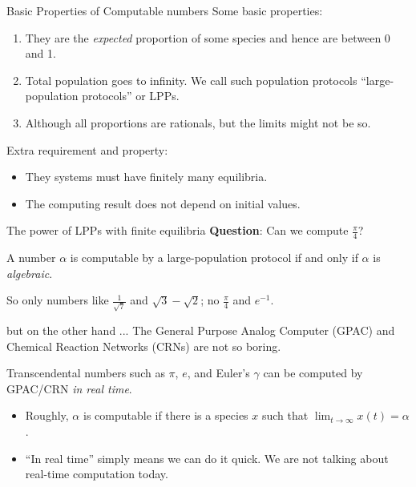 \documentclass[aspectratio=169]{beamer}
\begin{document}
\begin{frame}{Basic Properties of Computable numbers}
Some basic properties:
\begin{enumerate}
    \item They are the \emph{expected} proportion of some species and hence are between 0 and 1.
    \item Total population goes to infinity. We call such population protocols ``large-population protocols'' or LPPs.
    \item Although all proportions are rationals, but the limits might not be so.
\end{enumerate} \pause
Extra requirement and property:
\begin{itemize}
    \item They systems must have finitely many equilibria.
    \item The computing result does not depend on initial values.
\end{itemize}

\end{frame}

\begin{frame}[Clean]{The power of LPPs with finite equilibria}
    \textbf{Question}: Can we compute $\frac{\pi}{4}$?
\pause
\begin{theorem}
A number $\alpha$ is computable by a large-population protocol if and only if $\alpha$ is \emph{algebraic}.
\end{theorem}
\pause
So only numbers like  $\frac{1}{\sqrt{7}}$ and $\sqrt{3}-\sqrt{2}$; no $\frac{\pi}{4}$ and $e^{-1}$.
\end{frame}

\begin{frame}{but on the other hand ...}%
The General Purpose Analog Computer (GPAC) and Chemical Reaction Networks (CRNs) are not so boring.

\begin{theorem}
    Transcendental numbers such as $\pi$, $e$, and Euler's $\gamma$ can be computed by GPAC/CRN \emph{in real time}.
\end{theorem}
\begin{itemize}
    \item Roughly, $\alpha$ is computable if there is a species $x$ such that $\lim_{t\to \infty} x(t)=\alpha$.
    \item ``In real time'' simply means we can do it quick. We are not talking about real-time computation today.
\end{itemize}
\end{frame}
\end{document}
